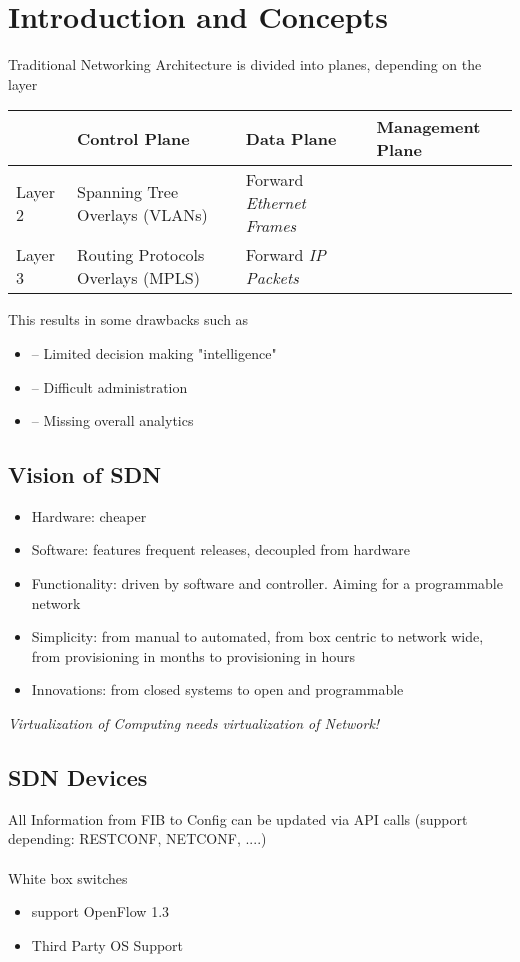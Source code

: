 \section{Introduction and Concepts}
Traditional Networking Architecture is divided into planes, depending on the layer
\begin{table}[h]
	\begin{tabular}{p{}|p{}|p{}|p{}}
		& Control Plane & Data Plane & Management Plane \\
		\hline
		Layer 2 & Spanning Tree Overlays (VLANs) & Forward \emph{Ethernet Frames} & \\
		\hline
		Layer 3 & Routing Protocols Overlays (MPLS) & Forward \emph{IP Packets} &
	\end{tabular}
\end{table}

\noindent
This results in some drawbacks such as
\begin{itemize}
	\item -- Limited decision making "intelligence"
	\item -- Difficult administration
	\item -- Missing overall analytics
\end{itemize}

\subsection{Vision of SDN}
\begin{itemize}
	\item Hardware: cheaper
	\item Software: features frequent releases, decoupled from hardware
	\item Functionality: driven by software and controller. Aiming for a programmable network
	\item Simplicity: from manual to automated, from box centric to network wide, from provisioning in months to provisioning in hours
	\item Innovations: from closed systems to open and programmable
\end{itemize}

\noindent
\emph{Virtualization of Computing needs virtualization of Network!}

\subsection{SDN Devices}
All Information from FIB to Config can be updated via API calls (support depending: RESTCONF, NETCONF, ....)
\\
\\
\noindent
White box switches 
\begin{itemize}
	\item support OpenFlow 1.3
	\item Third Party OS Support
\end{itemize}


